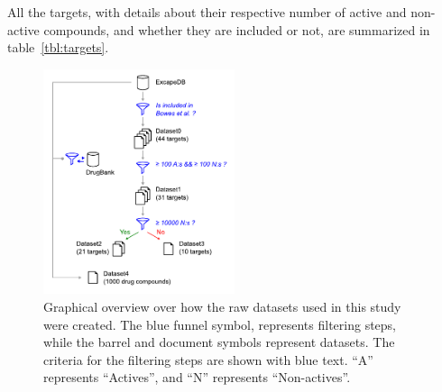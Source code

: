 \documentclass[utf8]{frontiersSCNS} %
\begin{document}
%
All the targets, with details about their respective number of active and
non-active compounds, and whether they are included or not, are summarized in
table~\ref{tbl:targets}.

\begin{figure}[t]
\begin{center}
\includegraphics[width=0.5\textwidth]{figures/datasets/datasets.pdf}
    \caption{Graphical overview over how the raw datasets used in this study
    were created. The blue funnel symbol, represents filtering steps, while
    the barrel and document symbols represent datasets. The criteria for the
    filtering steps are shown with blue text. ``A'' represents ``Actives'',
    and ``N'' represents ``Non-actives''.}
    \label{fig:datasets}
\end{center}
\end{figure}
\end{document}
